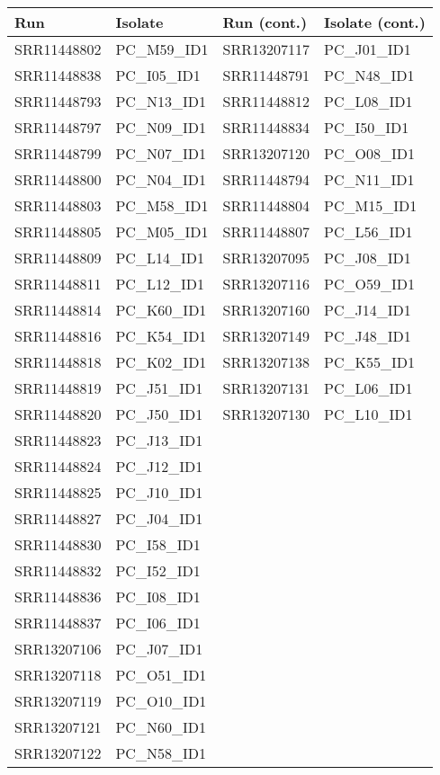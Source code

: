 \begin{table}[ht]
\centering
\begin{tabular}{llll}
\hline
Run & Isolate & Run (cont.) & Isolate (cont.) \\
\hline
SRR11448802 & PC\_M59\_ID1 & SRR13207117 & PC\_J01\_ID1 \\
SRR11448838 & PC\_I05\_ID1 & SRR11448791 & PC\_N48\_ID1 \\
SRR11448793 & PC\_N13\_ID1 & SRR11448812 & PC\_L08\_ID1 \\
SRR11448797 & PC\_N09\_ID1 & SRR11448834 & PC\_I50\_ID1 \\
SRR11448799 & PC\_N07\_ID1 & SRR13207120 & PC\_O08\_ID1 \\
SRR11448800 & PC\_N04\_ID1 & SRR11448794 & PC\_N11\_ID1 \\
SRR11448803 & PC\_M58\_ID1 & SRR11448804 & PC\_M15\_ID1 \\
SRR11448805 & PC\_M05\_ID1 & SRR11448807 & PC\_L56\_ID1 \\
SRR11448809 & PC\_L14\_ID1 & SRR13207095 & PC\_J08\_ID1 \\
SRR11448811 & PC\_L12\_ID1 & SRR13207116 & PC\_O59\_ID1 \\
SRR11448814 & PC\_K60\_ID1 & SRR13207160 & PC\_J14\_ID1 \\
SRR11448816 & PC\_K54\_ID1 & SRR13207149 & PC\_J48\_ID1 \\
SRR11448818 & PC\_K02\_ID1 & SRR13207138 & PC\_K55\_ID1 \\
SRR11448819 & PC\_J51\_ID1 & SRR13207131 & PC\_L06\_ID1 \\
SRR11448820 & PC\_J50\_ID1 & SRR13207130 & PC\_L10\_ID1 \\
SRR11448823 & PC\_J13\_ID1 \\
SRR11448824 & PC\_J12\_ID1 \\
SRR11448825 & PC\_J10\_ID1 \\
SRR11448827 & PC\_J04\_ID1 \\
SRR11448830 & PC\_I58\_ID1 \\
SRR11448832 & PC\_I52\_ID1 \\
SRR11448836 & PC\_I08\_ID1 \\
SRR11448837 & PC\_I06\_ID1 \\
SRR13207106 & PC\_J07\_ID1 \\
SRR13207118 & PC\_O51\_ID1 \\
SRR13207119 & PC\_O10\_ID1 \\
SRR13207121 & PC\_N60\_ID1 \\
SRR13207122 & PC\_N58\_ID1 \\

\end{tabular}
\end{table}
